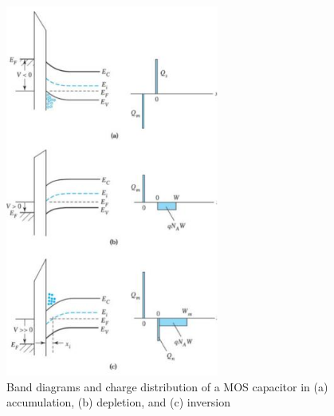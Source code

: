 \begin{figure}[h!]
\centering
\includegraphics[width=7cm]{figures/ch01/moscap.jpg}
\caption{Band diagrams and charge distribution of a MOS capacitor in (a) accumulation, (b) depletion, and (c) inversion} 
\label{fig:moscap}
\end{figure}

